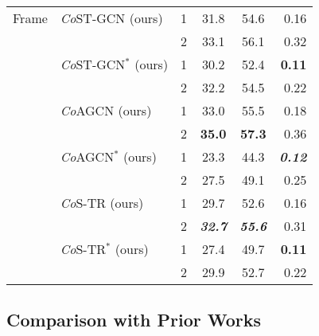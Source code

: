 \documentclass[journal]{IEEEtran}
\newcommand\paretocolor{lgreen!20}
\theoremstyle{definition}
\begin{document}
\begin{table}[!tbp]
\begin{center}
{\begin{tabular}{llcccr}
    \midrule
    Frame 
    & \textit{Co}ST-GCN (ours)                                  & 1     & 31.8      & 54.6  & 0.16 \\
    &                                                           & 2     & 33.1      & 56.1  & 0.32 \\
    & \textit{Co}ST-GCN$^*$ (ours)                              & 1     & \colorbox{\paretocolor}{30.2}      & \colorbox{\paretocolor}{52.4}  &  \colorbox{\paretocolor}{\textbf{0.11}} \\
    &                                                           & 2     & \colorbox{\paretocolor}{32.2}      & \colorbox{\paretocolor}{54.5}  & \colorbox{\paretocolor}{0.22} \\
    & \textit{Co}AGCN (ours)                                    & 1     & \colorbox{\paretocolor}{33.0}      & \colorbox{\paretocolor}{55.5}  & \colorbox{\paretocolor}{0.18} \\
    &                                                           & 2     & \colorbox{\paretocolor}{\textbf{35.0}}      & \colorbox{\paretocolor}{\textbf{57.3}}  & \colorbox{\paretocolor}{0.36} \\
    & \textit{Co}AGCN$^*$ (ours)                                & 1     & 23.3      & 44.3  & \textbf{\textit{0.12}} \\
    &                                                           & 2     & 27.5      & 49.1  & 0.25 \\
    & \textit{Co}S-TR (ours)                                    & 1     & 29.7      & 52.6  & 0.16 \\
    &                                                           & 2     & \colorbox{\paretocolor}{\textbf{\textit{32.7}}}      & \colorbox{\paretocolor}{\textbf{\textit{55.6}}}  & \colorbox{\paretocolor}{0.31} \\
    & \textit{Co}S-TR$^*$ (ours)                                & 1     & 27.4      & 49.7  & \textbf{0.11} \\
    &                                                           & 2     & 29.9      & 52.7  & 0.22 \\
    \bottomrule
\end{tabular}
}
\end{center}
\vspace{-10pt}
\end{table}


\subsection{Comparison with Prior Works}
\end{document}
